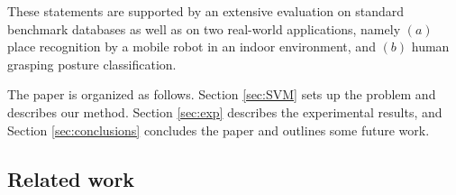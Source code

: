 These statements are supported by an extensive evaluation on standard
benchmark databases as well as on two real-world applications, namely
$(a)$ place recognition by a mobile robot in an indoor environment,
and $(b)$ human grasping posture classification.

The paper is organized as follows. Section \ref{sec:SVM} sets up the problem
and describes our method. 
Section
\ref{sec:exp} describes the experimental results, and Section
\ref{sec:conclusions} concludes the paper and outlines some future
work.

\subsection*{Related work}


